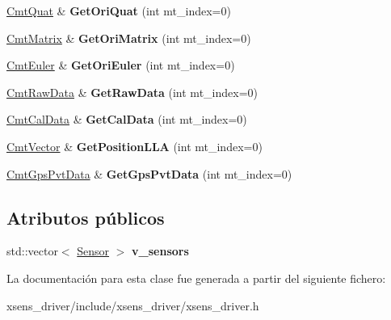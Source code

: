 \begin{DoxyCompactItemize}
\item 
\hypertarget{classxsens_1_1Driver_a4119fe8be2719bb96fd04ece397b6ae5}{\hyperlink{structCmtQuat}{\-Cmt\-Quat} \& {\bfseries \-Get\-Ori\-Quat} (int mt\-\_\-index=0)}\label{classxsens_1_1Driver_a4119fe8be2719bb96fd04ece397b6ae5}

\item 
\hypertarget{classxsens_1_1Driver_a197277222d62faac554adc3e4f69125b}{\hyperlink{structCmtMatrix}{\-Cmt\-Matrix} \& {\bfseries \-Get\-Ori\-Matrix} (int mt\-\_\-index=0)}\label{classxsens_1_1Driver_a197277222d62faac554adc3e4f69125b}

\item 
\hypertarget{classxsens_1_1Driver_a98773334d95ae6372ce3f7ef78ecfaae}{\hyperlink{structCmtEuler}{\-Cmt\-Euler} \& {\bfseries \-Get\-Ori\-Euler} (int mt\-\_\-index=0)}\label{classxsens_1_1Driver_a98773334d95ae6372ce3f7ef78ecfaae}

\item 
\hypertarget{classxsens_1_1Driver_aeb9ce05d9948c871ec6f5d2750ea3996}{\hyperlink{structCmtRawData}{\-Cmt\-Raw\-Data} \& {\bfseries \-Get\-Raw\-Data} (int mt\-\_\-index=0)}\label{classxsens_1_1Driver_aeb9ce05d9948c871ec6f5d2750ea3996}

\item 
\hypertarget{classxsens_1_1Driver_a50ec7c3dc6033a106d334231954ec1f5}{\hyperlink{structCmtCalData}{\-Cmt\-Cal\-Data} \& {\bfseries \-Get\-Cal\-Data} (int mt\-\_\-index=0)}\label{classxsens_1_1Driver_a50ec7c3dc6033a106d334231954ec1f5}

\item 
\hypertarget{classxsens_1_1Driver_aa90dddcdad4e1a4e26e6e552810056d0}{\hyperlink{structCmtVector}{\-Cmt\-Vector} \& {\bfseries \-Get\-Position\-L\-L\-A} (int mt\-\_\-index=0)}\label{classxsens_1_1Driver_aa90dddcdad4e1a4e26e6e552810056d0}

\item 
\hypertarget{classxsens_1_1Driver_a160254b504179be941c05be6660f7410}{\hyperlink{structCmtGpsPvtData}{\-Cmt\-Gps\-Pvt\-Data} \& {\bfseries \-Get\-Gps\-Pvt\-Data} (int mt\-\_\-index=0)}\label{classxsens_1_1Driver_a160254b504179be941c05be6660f7410}

\end{DoxyCompactItemize}
\subsection*{\-Atributos públicos}
\begin{DoxyCompactItemize}
\item 
\hypertarget{classxsens_1_1Driver_a243584c0cd88ba7b4794f0802bbaf884}{std\-::vector$<$ \hyperlink{classxsens_1_1Sensor}{\-Sensor} $>$ {\bfseries v\-\_\-sensors}}\label{classxsens_1_1Driver_a243584c0cd88ba7b4794f0802bbaf884}

\end{DoxyCompactItemize}


\-La documentación para esta clase fue generada a partir del siguiente fichero\-:\begin{DoxyCompactItemize}
\item 
xsens\-\_\-driver/include/xsens\-\_\-driver/xsens\-\_\-driver.\-h\end{DoxyCompactItemize}
